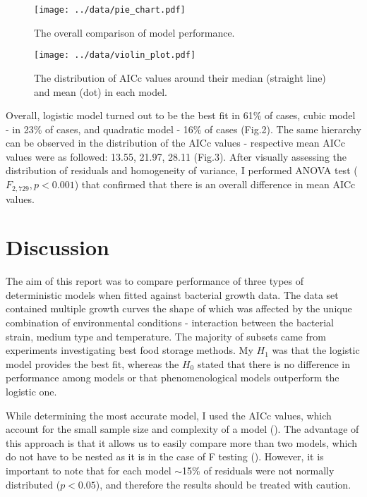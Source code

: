 \documentclass[a4paper,11pt]{article}
\begin{document}
\begin{figure}[!ht]
\centering
\begin{minipage}{.5\textwidth}
    \centering
    \texttt{[image: ../data/pie\_chart.pdf]}
    \caption{The overall comparison of model performance.}
    \label{fig.test1}
\end{minipage}%
\begin{minipage}{.5\textwidth}
    \centering
    \texttt{[image: ../data/violin\_plot.pdf]}
    \caption{The distribution of AICc values around their median (straight line) and mean (dot) in each model.}
    \label{fig:test2}
\end{minipage}
\end{figure}

Overall, logistic model turned out to be the best fit in 61\% of cases, cubic model - in 23\% of cases, and quadratic model - 16\% of cases (Fig.2). The same hierarchy can be observed in the distribution of the AICc values - respective mean AICc values were as followed: 13.55, 21.97, 28.11 (Fig.3). After visually assessing the distribution of residuals and homogeneity of variance, I performed ANOVA test ($F_{2,729}, p < 0.001$) that confirmed that there is an overall difference in mean AICc values.

\section{Discussion}
    
The aim of this report was to compare performance of three types of deterministic models when fitted against bacterial growth data. The data set contained multiple growth curves the shape of which was affected by the unique combination of environmental conditions - interaction between the bacterial strain, medium type and temperature. The majority of subsets came from experiments investigating best food storage methods. My $H_{1}$ was that the logistic model provides the best fit, whereas the $H_{0}$ stated that there is no difference in performance among models or that phenomenological models outperform the logistic one. \par 

While determining the most accurate model, I used the AICc values, which account for the small sample size  and complexity of a model (\cite{johnson2004model}). The advantage of this approach is that it allows us to easily compare more than two models, which do not have to be nested as it is in the case of F testing (\cite{motulsky2004fitting}). However, it is important to note that for each model $\sim$15\% of residuals were not normally distributed ($p < 0.05$), and therefore the results should be treated with caution.\par
\end{document}

